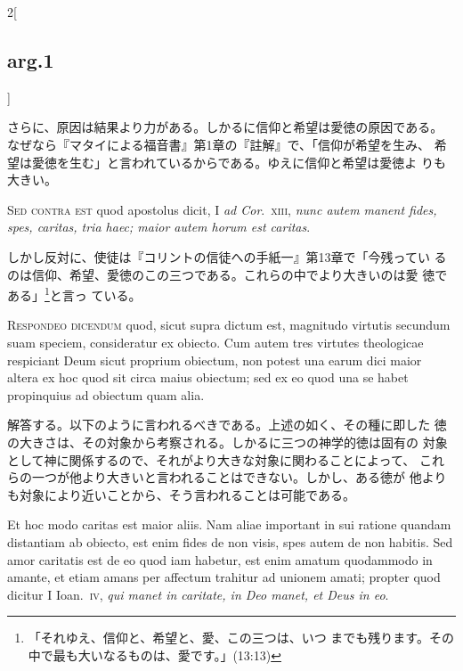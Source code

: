 \documentclass[paper=a4paper,fontsize=10pt,jafontsize=9pt,titlepage]{jlreq}
\begin{document}
\begin{paracol}{2}[\subsection{arg.1}]
\switchcolumn

さらに、原因は結果より力がある。しかるに信仰と希望は愛徳の原因である。
 なぜなら『マタイによる福音書』第1章の『註解』で、「信仰が希望を生み、
 希望は愛徳を生む」と言われているからである。ゆえに信仰と希望は愛徳よ
 りも大きい。

\switchcolumn*[\subsection{s.c.}]

{\scshape Sed contra est} quod apostolus dicit, I {\itshape ad
Cor}.~{\scshape xiii}, {\itshape nunc autem manent fides, spes,
caritas, tria haec; maior autem horum est caritas}.

\switchcolumn

しかし反対に、使徒は『コリントの信徒への手紙一』第13章で「今残ってい
 るのは信仰、希望、愛徳のこの三つである。これらの中でより大きいのは愛
 徳である」\footnote{「それゆえ、信仰と、希望と、愛、この三つは、いつ
 までも残ります。その中で最も大いなるものは、愛です。」(13:13)}と言っ
 ている。


{\scshape Respondeo dicendum} quod, sicut supra dictum est, magnitudo
 virtutis secundum suam speciem, consideratur ex obiecto. Cum autem
 tres virtutes theologicae respiciant Deum sicut proprium obiectum,
 non potest una earum dici maior altera ex hoc quod sit circa maius
 obiectum; sed ex eo quod una se habet propinquius ad obiectum quam
 alia.

\switchcolumn

解答する。以下のように言われるべきである。上述の如く、その種に即した
 徳の大きさは、その対象から考察される。しかるに三つの神学的徳は固有の
 対象として神に関係するので、それがより大きな対象に関わることによって、
 これらの一つが他より大きいと言われることはできない。しかし、ある徳が
 他よりも対象により近いことから、そう言われることは可能である。

\switchcolumn*

Et hoc modo caritas est maior aliis. Nam aliae important in sui
 ratione quandam distantiam ab obiecto, est enim fides de non visis,
 spes autem de non habitis. Sed amor caritatis est de eo quod iam
 habetur, est enim amatum quodammodo in amante, et etiam amans per
 affectum trahitur ad unionem amati; propter quod dicitur I
 Ioan.~{\scshape iv}, {\itshape qui manet in caritate, in Deo manet,
 et Deus in eo}.


\end{paracol}
\end{document}
